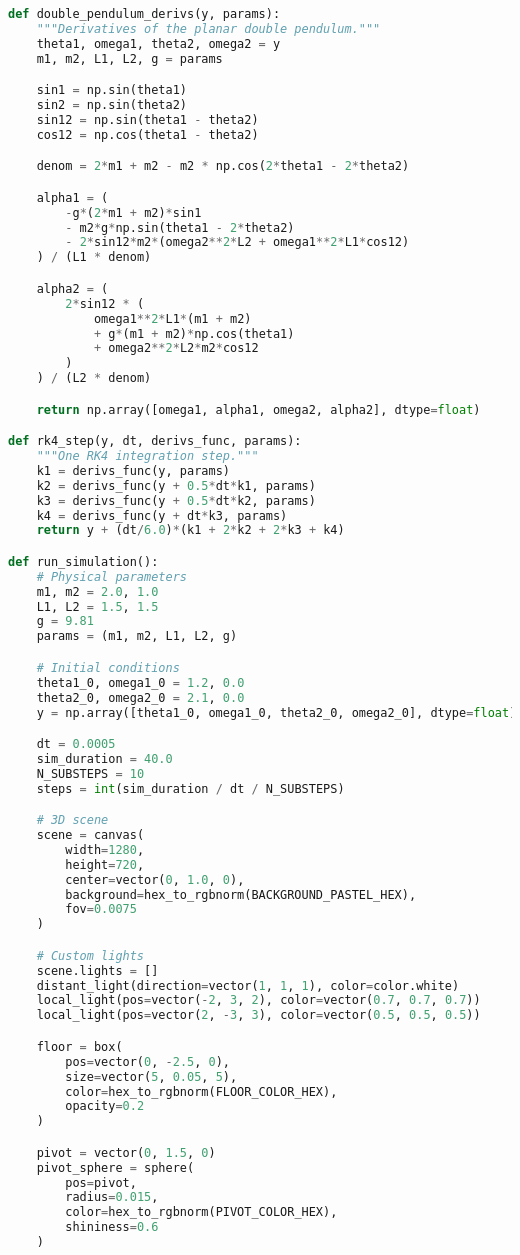 \documentclass[letterpaper,12pt]{article}
\begin{document}
\begin{enumerate}[leftmargin=*, itemsep=1em]
\begin{lstlisting}[language=Python, caption=Double Pendulum Simulation with Pastel Palette, label=lst:doublependulum]
def double_pendulum_derivs(y, params):
    """Derivatives of the planar double pendulum."""
    theta1, omega1, theta2, omega2 = y
    m1, m2, L1, L2, g = params

    sin1 = np.sin(theta1)
    sin2 = np.sin(theta2)
    sin12 = np.sin(theta1 - theta2)
    cos12 = np.cos(theta1 - theta2)

    denom = 2*m1 + m2 - m2 * np.cos(2*theta1 - 2*theta2)

    alpha1 = (
        -g*(2*m1 + m2)*sin1
        - m2*g*np.sin(theta1 - 2*theta2)
        - 2*sin12*m2*(omega2**2*L2 + omega1**2*L1*cos12)
    ) / (L1 * denom)

    alpha2 = (
        2*sin12 * (
            omega1**2*L1*(m1 + m2)
            + g*(m1 + m2)*np.cos(theta1)
            + omega2**2*L2*m2*cos12
        )
    ) / (L2 * denom)

    return np.array([omega1, alpha1, omega2, alpha2], dtype=float)

def rk4_step(y, dt, derivs_func, params):
    """One RK4 integration step."""
    k1 = derivs_func(y, params)
    k2 = derivs_func(y + 0.5*dt*k1, params)
    k3 = derivs_func(y + 0.5*dt*k2, params)
    k4 = derivs_func(y + dt*k3, params)
    return y + (dt/6.0)*(k1 + 2*k2 + 2*k3 + k4)

def run_simulation():
    # Physical parameters
    m1, m2 = 2.0, 1.0
    L1, L2 = 1.5, 1.5
    g = 9.81
    params = (m1, m2, L1, L2, g)

    # Initial conditions
    theta1_0, omega1_0 = 1.2, 0.0
    theta2_0, omega2_0 = 2.1, 0.0
    y = np.array([theta1_0, omega1_0, theta2_0, omega2_0], dtype=float)

    dt = 0.0005
    sim_duration = 40.0
    N_SUBSTEPS = 10
    steps = int(sim_duration / dt / N_SUBSTEPS)

    # 3D scene
    scene = canvas(
        width=1280,
        height=720,
        center=vector(0, 1.0, 0),
        background=hex_to_rgbnorm(BACKGROUND_PASTEL_HEX),
        fov=0.0075
    )

    # Custom lights
    scene.lights = []
    distant_light(direction=vector(1, 1, 1), color=color.white)
    local_light(pos=vector(-2, 3, 2), color=vector(0.7, 0.7, 0.7))
    local_light(pos=vector(2, -3, 3), color=vector(0.5, 0.5, 0.5))

    floor = box(
        pos=vector(0, -2.5, 0),
        size=vector(5, 0.05, 5),
        color=hex_to_rgbnorm(FLOOR_COLOR_HEX),
        opacity=0.2
    )

    pivot = vector(0, 1.5, 0)
    pivot_sphere = sphere(
        pos=pivot,
        radius=0.015,
        color=hex_to_rgbnorm(PIVOT_COLOR_HEX),
        shininess=0.6
    )


\end{lstlisting}
\end{enumerate}
\end{document}
